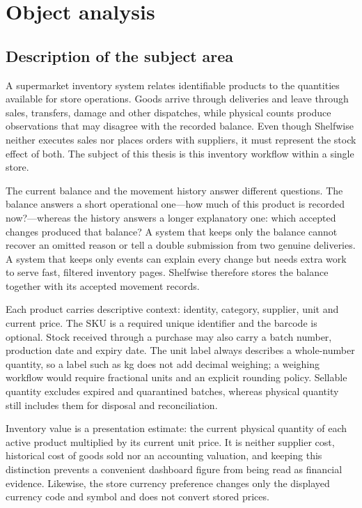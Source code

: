 \chapter{Object analysis}

\FloatBarrier

\section{Description of the subject area}

A supermarket inventory system relates identifiable products to the quantities available for store operations. Goods arrive through deliveries and leave through sales, transfers, damage and other dispatches, while physical counts produce observations that may disagree with the recorded balance. Even though Shelfwise neither executes sales nor places orders with suppliers, it must represent the stock effect of both. The subject of this thesis is this inventory workflow within a single store.


The current balance and the movement history answer different questions. The balance answers a short operational one—how much of this product is recorded now?—whereas the history answers a longer explanatory one: which accepted changes produced that balance? A system that keeps only the balance cannot recover an omitted reason or tell a double submission from two genuine deliveries. A system that keeps only events can explain every change but needs extra work to serve fast, filtered inventory pages. Shelfwise therefore stores the balance together with its accepted movement records.


Each product carries descriptive context: identity, category, supplier, unit and current price. The SKU is a required unique identifier and the barcode is optional. Stock received through a purchase may also carry a batch number, production date and expiry date. The unit label always describes a whole-number quantity, so a label such as kg does not add decimal weighing; a weighing workflow would require fractional units and an explicit rounding policy. Sellable quantity excludes expired and quarantined batches, whereas physical quantity still includes them for disposal and reconciliation.


Inventory value is a presentation estimate: the current physical quantity of each active product multiplied by its current unit price. It is neither supplier cost, historical cost of goods sold nor an accounting valuation, and keeping this distinction prevents a convenient dashboard figure from being read as financial evidence. Likewise, the store currency preference changes only the displayed currency code and symbol and does not convert stored prices.


